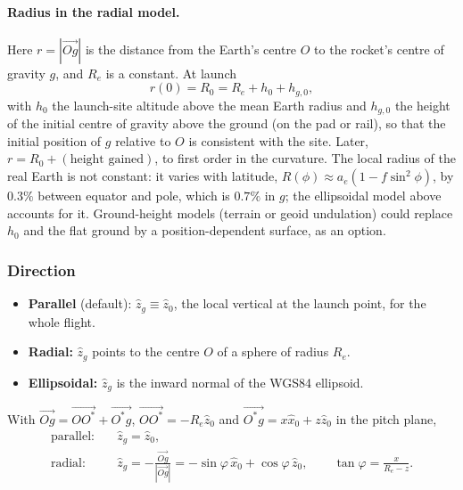 \paragraph{Radius in the radial model.} Here $r=|\vec{Og}|$ is the distance from the Earth's
centre $O$ to the rocket's centre of gravity $g$, and $R_e$ is a constant. At launch
\begin{equation}
    r(0)=R_0=R_e+h_0+h_{g,0},
\end{equation}
with $h_0$ the launch-site altitude above the mean Earth radius and $h_{g,0}$ the height of the
initial centre of gravity above the ground (on the pad or rail), so that the initial position of
$g$ relative to $O$ is consistent with the site. Later, $r=R_0+(\text{height gained})$, to first
order in the curvature. The local radius of the real Earth is not constant: it varies with
latitude, $R(\phi)\approx a_e(1-f\sin^2\phi)$, by $0.3\%$ between equator and pole, which is
$0.7\%$ in $g$; the ellipsoidal model above accounts for it. Ground-height models (terrain or
geoid undulation) could replace $h_0$ and the flat ground by a position-dependent surface, as an
option.

\subsubsection{Direction}
\begin{itemize}
    \item \textbf{Parallel} (default): $\hat{z}_g\equiv\hat{z}_0$, the local vertical at the launch
    point, for the whole flight.
    \item \textbf{Radial:} $\hat{z}_g$ points to the centre $O$ of a sphere of radius $R_e$.
    \item \textbf{Ellipsoidal:} $\hat{z}_g$ is the inward normal of the WGS84 ellipsoid.
\end{itemize}
With $\vec{Og}=\vec{OO^*}+\vec{O^*g}$, $\vec{OO^*}=-R_e\hat{z}_0$ and $\vec{O^*g}=x\hat{x}_0+z\hat{z}_0$
in the pitch plane,
\begin{align}
    \text{parallel:}\quad & \hat{z}_g = \hat{z}_0, \\
    \text{radial:}\quad & \hat{z}_g = -\frac{\vec{Og}}{|\vec{Og}|}
        = -\sin\varphi\,\hat{x}_0 + \cos\varphi\,\hat{z}_0, \qquad \tan\varphi=\frac{x}{R_e-z}.
        \label{eq:zhat_g_rotated}
\end{align}

